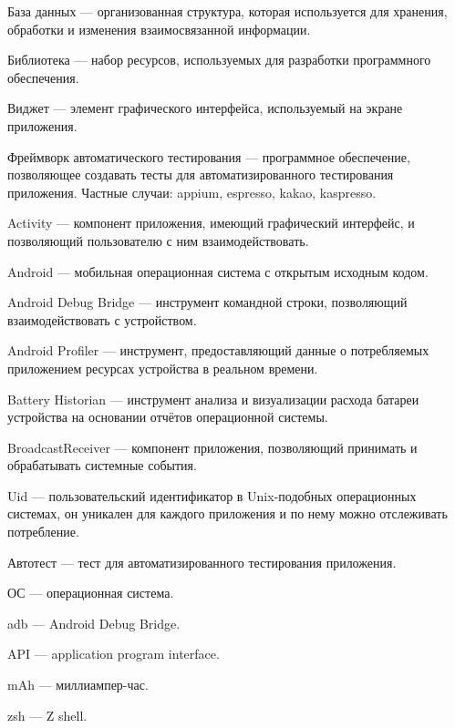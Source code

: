 \documentclass[a4paper,14pt]{extarticle} %
\begin{document}
	\newpage
	
	База данных --- организованная структура, которая используется для хранения, обработки и изменения взаимосвязанной информации.
	
	Библиотека --- набор ресурсов, используемых для разработки программного обеспечения.
	
	Виджет --- элемент графического интерфейса, используемый на экране приложения.
	
	Фреймворк автоматического тестирования --- программное обеспечение, позволяющее создавать тесты для автоматизированного тестирования приложения. Частные случаи: appium, espresso, kakao, kaspresso.
	
	Activity --- компонент приложения, имеющий графический интерфейс, и позволяющий пользователю с ним взаимодействовать.
	
	Android --- мобильная операционная система с открытым исходным кодом.
	
	Android Debug Bridge --- инструмент командной строки, позволяющий взаимодействовать с устройством.
	
	Android Profiler --- инструмент, предоставляющий данные о потребляемых приложением ресурсах устройства в реальном времени.
	
	Battery Historian --- инструмент анализа и визуализации расхода батареи устройства на основании отчётов операционной системы.
	
	BroadcastReceiver --- компонент приложения, позволяющий принимать и обрабатывать системные события.
	
	Uid --- пользовательский идентификатор в Unix-подобных операционных системах, он уникален для каждого приложения и по нему можно отслеживать потребление.

	\newpage
	
	Автотест --- тест для автоматизированного тестирования приложения.
	
	ОС --- операционная система.
	
	adb --- Android Debug Bridge.
	
	API --- application program interface.
	
	mAh --- миллиампер-час.
	
	zsh --- Z shell.
	
	\newpage
	
	\printbibliography[heading=none]
	
\end{document}
